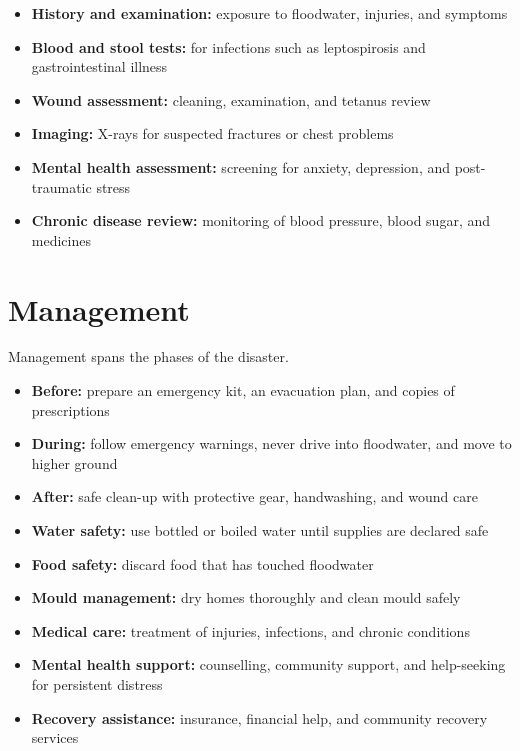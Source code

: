 \begin{itemize}
    \item \textbf{History and examination:} exposure to floodwater, injuries, and symptoms
    \item \textbf{Blood and stool tests:} for infections such as leptospirosis and gastrointestinal illness
    \item \textbf{Wound assessment:} cleaning, examination, and tetanus review
    \item \textbf{Imaging:} X-rays for suspected fractures or chest problems
    \item \textbf{Mental health assessment:} screening for anxiety, depression, and post-traumatic stress
    \item \textbf{Chronic disease review:} monitoring of blood pressure, blood sugar, and medicines
\end{itemize}

\section*{Management}
Management spans the phases of the disaster.

\begin{itemize}
    \item \textbf{Before:} prepare an emergency kit, an evacuation plan, and copies of prescriptions
    \item \textbf{During:} follow emergency warnings, never drive into floodwater, and move to higher ground
    \item \textbf{After:} safe clean-up with protective gear, handwashing, and wound care
    \item \textbf{Water safety:} use bottled or boiled water until supplies are declared safe
    \item \textbf{Food safety:} discard food that has touched floodwater
    \item \textbf{Mould management:} dry homes thoroughly and clean mould safely
    \item \textbf{Medical care:} treatment of injuries, infections, and chronic conditions
    \item \textbf{Mental health support:} counselling, community support, and help-seeking for persistent distress
    \item \textbf{Recovery assistance:} insurance, financial help, and community recovery services
\end{itemize}

